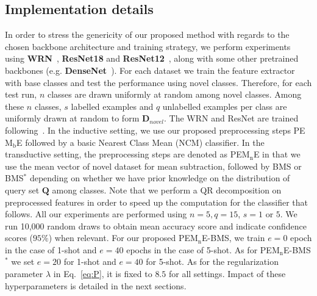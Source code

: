 \documentclass[review]{elsarticle}
\begin{document}
\subsection{Implementation details}

In order to stress the genericity of our proposed method with regards to the chosen backbone architecture and training strategy, we perform experiments using \textbf{WRN}~\cite{DBLP:conf/bmvc/ZagoruykoK16}, \textbf{ResNet18} and \textbf{ResNet12}~\cite{he2016deep}, along with some other pretrained backbones (e.g. \textbf{DenseNet}~\cite{huang2017densely, DBLP:journals/corr/abs-1911-04623}). For each dataset we train the feature extractor with base classes and test the performance using novel classes. Therefore, for each test run, $n$ classes are drawn uniformly at random among novel classes. Among these $n$ classes, $s$ labelled examples and $q$ unlabelled examples per class are uniformly drawn at random to form $\mathbf{D}_{novel}$. The WRN and ResNet are trained following~\cite{mangla2020charting}. In the inductive setting, we use our proposed preprocessing steps PE$\mathrm{M_b}$E followed by a basic Nearest Class Mean (NCM) classifier. In the transductive setting, the preprocessing steps are denoted as PE$\mathrm{M_n}$E in that we use the mean vector of novel dataset for mean subtraction, followed by BMS or BMS$^*$ depending on whether we have prior knowledge on the distribution of query set $\mathbf{Q}$ among classes. Note that we perform a QR decomposition on preprocessed features in order to speed up the computation for the classifier that follows. All our experiments are performed using $n=5, q=15$, $s=1$ or $5$. We run 10,000 random draws to obtain mean accuracy score and indicate confidence scores ($95\%$) when relevant. For our proposed PE$\mathrm{M_n}$E-BMS, we train $e=0$ epoch in the case of 1-shot and $e=40$ epochs in the case of 5-shot. As for PE$\mathrm{M_n}$E-BMS$^*$ we set $e=20$ for 1-shot and $e=40$ for 5-shot. As for the regularization parameter $\lambda$ in Eq.~\ref{eq:P}, it is fixed to $8.5$ for all settings. Impact of these hyperparameters is detailed in the next sections.
\end{document}
